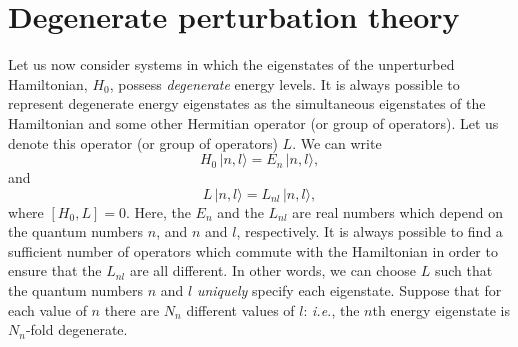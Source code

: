 \section{Degenerate perturbation theory}\label{s6.5}
Let us now consider systems  in which the eigenstates of
the unperturbed Hamiltonian, $H_0$,  possess
{\em degenerate} energy levels. It is always possible to
represent degenerate energy eigenstates
as the simultaneous eigenstates 
of the Hamiltonian and some other Hermitian operator (or group
of operators). Let us denote this operator (or group of operators) $L$.
We can write
\begin{equation}
H_0\, |n, l\rangle = E_n\, |n, l\rangle,
\end{equation}
and
\begin{equation}
L\,|n,l\rangle = L_{nl}\, |n, l\rangle,
\end{equation}
where $[H_0, L] = 0$. Here, the $E_n$ and the $L_{nl}$ are real numbers which
depend on the quantum numbers $n$, and $n$ and $l$, respectively.
 It is always possible
to find a sufficient number of operators which commute with the Hamiltonian
in order to ensure 
that the $L_{nl}$ are all different. In other words, we can
choose $L$ such that the quantum numbers
$n$ and $l$ {\em uniquely} specify each eigenstate. Suppose that for each value
of $n$ there are $N_n$ different values of $l$: {\em i.e.}, the $n$th energy eigenstate
is $N_n$-fold degenerate. 


